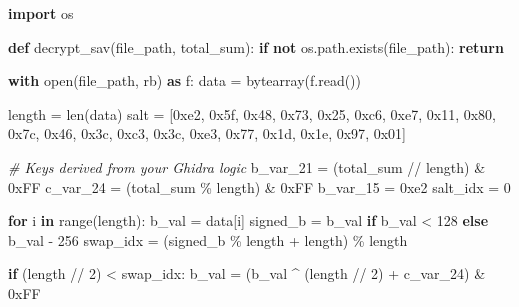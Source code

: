 \documentclass[
]{article}
\newenvironment{Shaded}{}{}
\newcommand{\BaseNTok}[1]{\textcolor[rgb]{0.25,0.63,0.44}{#1}}
\newcommand{\BuiltInTok}[1]{\textcolor[rgb]{0.00,0.50,0.00}{#1}}
\newcommand{\CommentTok}[1]{\textcolor[rgb]{0.38,0.63,0.69}{\textit{#1}}}
\newcommand{\ControlFlowTok}[1]{\textcolor[rgb]{0.00,0.44,0.13}{\textbf{#1}}}
\newcommand{\DecValTok}[1]{\textcolor[rgb]{0.25,0.63,0.44}{#1}}
\newcommand{\ImportTok}[1]{\textcolor[rgb]{0.00,0.50,0.00}{\textbf{#1}}}
\newcommand{\KeywordTok}[1]{\textcolor[rgb]{0.00,0.44,0.13}{\textbf{#1}}}
\newcommand{\NormalTok}[1]{#1}
\newcommand{\OperatorTok}[1]{\textcolor[rgb]{0.40,0.40,0.40}{#1}}
\newcommand{\StringTok}[1]{\textcolor[rgb]{0.25,0.44,0.63}{#1}}
\begin{document}
\begin{Shaded}
\begin{Highlighting}[]
\ImportTok{import}\NormalTok{ os}

\KeywordTok{def}\NormalTok{ decrypt\_sav(file\_path, total\_sum):}
    \ControlFlowTok{if} \KeywordTok{not}\NormalTok{ os.path.exists(file\_path): }\ControlFlowTok{return}
    
    \ControlFlowTok{with} \BuiltInTok{open}\NormalTok{(file\_path, }\StringTok{\textquotesingle{}rb\textquotesingle{}}\NormalTok{) }\ImportTok{as}\NormalTok{ f:}
\NormalTok{        data }\OperatorTok{=} \BuiltInTok{bytearray}\NormalTok{(f.read())}
    
\NormalTok{    length }\OperatorTok{=} \BuiltInTok{len}\NormalTok{(data)}
\NormalTok{    salt }\OperatorTok{=}\NormalTok{ [}\BaseNTok{0xe2}\NormalTok{, }\BaseNTok{0x5f}\NormalTok{, }\BaseNTok{0x48}\NormalTok{, }\BaseNTok{0x73}\NormalTok{, }\BaseNTok{0x25}\NormalTok{, }\BaseNTok{0xc6}\NormalTok{, }\BaseNTok{0xe7}\NormalTok{, }\BaseNTok{0x11}\NormalTok{, }
            \BaseNTok{0x80}\NormalTok{, }\BaseNTok{0x7c}\NormalTok{, }\BaseNTok{0x46}\NormalTok{, }\BaseNTok{0x3c}\NormalTok{, }\BaseNTok{0xc3}\NormalTok{, }\BaseNTok{0x3c}\NormalTok{, }\BaseNTok{0xe3}\NormalTok{, }\BaseNTok{0x77}\NormalTok{, }
            \BaseNTok{0x1d}\NormalTok{, }\BaseNTok{0x1e}\NormalTok{, }\BaseNTok{0x97}\NormalTok{, }\BaseNTok{0x01}\NormalTok{]}

    \CommentTok{\# Keys derived from your Ghidra logic}
\NormalTok{    b\_var\_21 }\OperatorTok{=}\NormalTok{ (total\_sum }\OperatorTok{//}\NormalTok{ length) }\OperatorTok{\&} \BaseNTok{0xFF}
\NormalTok{    c\_var\_24 }\OperatorTok{=}\NormalTok{ (total\_sum }\OperatorTok{\%}\NormalTok{ length) }\OperatorTok{\&} \BaseNTok{0xFF}
\NormalTok{    b\_var\_15 }\OperatorTok{=} \BaseNTok{0xe2}
\NormalTok{    salt\_idx }\OperatorTok{=} \DecValTok{0}

    \ControlFlowTok{for}\NormalTok{ i }\KeywordTok{in} \BuiltInTok{range}\NormalTok{(length):}
\NormalTok{        b\_val }\OperatorTok{=}\NormalTok{ data[i]}
\NormalTok{        signed\_b }\OperatorTok{=}\NormalTok{ b\_val }\ControlFlowTok{if}\NormalTok{ b\_val }\OperatorTok{\textless{}} \DecValTok{128} \ControlFlowTok{else}\NormalTok{ b\_val }\OperatorTok{{-}} \DecValTok{256}
\NormalTok{        swap\_idx }\OperatorTok{=}\NormalTok{ (signed\_b }\OperatorTok{\%}\NormalTok{ length }\OperatorTok{+}\NormalTok{ length) }\OperatorTok{\%}\NormalTok{ length}
        
        \ControlFlowTok{if}\NormalTok{ (length }\OperatorTok{//} \DecValTok{2}\NormalTok{) }\OperatorTok{\textless{}}\NormalTok{ swap\_idx:}
\NormalTok{            b\_val }\OperatorTok{=}\NormalTok{ (b\_val }\OperatorTok{\^{}}\NormalTok{ (length }\OperatorTok{//} \DecValTok{2}\NormalTok{) }\OperatorTok{+}\NormalTok{ c\_var\_24) }\OperatorTok{\&} \BaseNTok{0xFF}
        

\end{Highlighting}
\end{Shaded}
\end{document}
